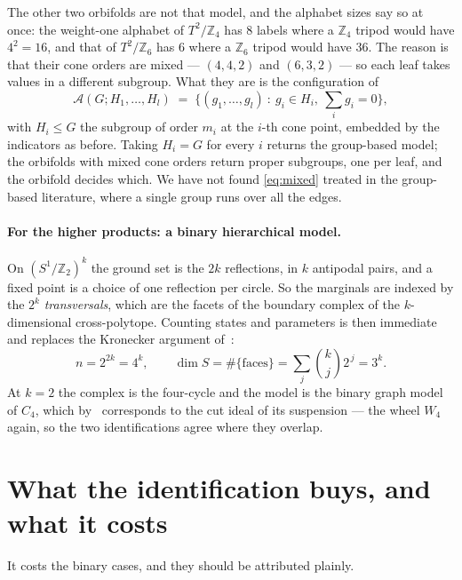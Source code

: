\documentclass[11pt,a4paper]{article}
\theoremstyle{definition}
\newcommand{\ZZ}{\mathbb{Z}}
\begin{document}
The other two orbifolds are not that model, and the alphabet sizes say so at once: the weight-one
alphabet of $T^2/\ZZ_4$ has $8$ labels where a $\ZZ_4$ tripod would have $4^2=16$, and that of
$T^2/\ZZ_6$ has $6$ where a $\ZZ_6$ tripod would have $36$. The reason is that their cone orders are
mixed --- $(4,4,2)$ and $(6,3,2)$ --- so each leaf takes values in a different subgroup. What they
are is the configuration of
\begin{equation}\label{eq:mixed}
\boxed{\;\mathcal A(G;H_1,\dots,H_l)\;=\;\Big\{(g_1,\dots,g_l)\ :\ g_i\in H_i,\ \textstyle\sum_i
g_i=0\Big\},\;}
\end{equation}
with $H_i\le G$ the subgroup of order $m_i$ at the $i$-th cone point, embedded by the indicators as
before. Taking $H_i=G$ for every $i$ returns the group-based model; the orbifolds with mixed cone
orders return proper subgroups, one per leaf, and the orbifold decides which. We have not found
\eqref{eq:mixed} treated in the group-based literature, where a single group runs over all the
edges.

\paragraph{For the higher products: a binary hierarchical model.} On $(S^1/\ZZ_2)^k$ the ground set
is the $2k$ reflections, in $k$ antipodal pairs, and a fixed point is a choice of one reflection per
circle. So the marginals are indexed by the $2^k$ \emph{transversals}, which are the facets of the
boundary complex of the $k$-dimensional cross-polytope. Counting states and parameters is then
immediate and replaces the Kronecker argument of~\cite{IXA}:
\begin{equation}\label{eq:kcount}
\boxed{\;n=2^{2k}=4^k,\qquad \dim S=\#\{\text{faces}\}=\sum_{j}\binom{k}{j}2^{\,j}=3^k.\;}
\end{equation}
At $k=2$ the complex is the four-cycle and the model is the binary graph model of $C_4$, which
by~\cite[\S4]{SScuts} corresponds to the cut ideal of its suspension --- the wheel $W_4$ again, so
the two identifications agree where they overlap.

\section{What the identification buys, and what it costs}\label{sec:known}

It costs the binary cases, and they should be attributed plainly.
\end{document}
